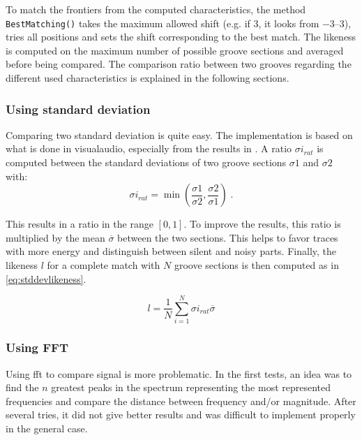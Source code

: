 To match the frontiers from the computed characteristics, the method \texttt{BestMatching()} takes the maximum allowed shift (e.g. if 3, it looks from \numrange{-3}{3}), tries all positions and sets the shift corresponding to the best match. The likeness is computed on the maximum number of possible groove sections and averaged before being compared. The comparison ratio between two grooves regarding the different used characteristics is explained in the following sections.

\subsubsection{Using standard deviation}

Comparing two standard deviation is quite easy. The implementation is based on what is done in \gls{visualaudio}, especially from the results in \cite{benningerchunk12}. A ratio $\sigma i_{rat}$ is computed between the standard deviations of two groove sections $\sigma 1$ and $\sigma 2$ with:
\begin{equation}
\label{eq:stddevratio}
\sigma i_{rat} = \min\left(\frac{\sigma 1}{\sigma 2}, \frac{\sigma 2}{\sigma 1}\right) \; .
\end{equation}

This results in a ratio in the range $[0,1]$. To improve the results, this ratio is multiplied by the mean $\overline{\sigma}$ between the two sections. This helps to favor traces with more energy and distinguish between silent and noisy parts. Finally, the likeness $l$ for a complete match with $N$ groove sections is then computed as in \eqref{eq:stddevlikeness}.

\begin{equation}
\label{eq:stddevlikeness}
l = \frac{1}{N} \sum_{i=1}^{N} \sigma i_{rat} \overline{\sigma}
\end{equation}

\subsubsection{Using FFT}

Using \gls{fft} to compare signal is more problematic. In the first tests, an idea was to find the $n$ greatest peaks in the spectrum representing the most represented frequencies and compare the distance between frequency and/or magnitude. After several tries, it did not give better results and was difficult to implement properly in the general case.

